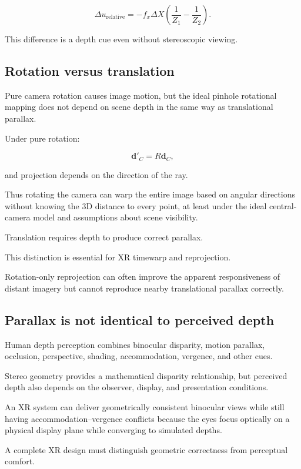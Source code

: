 \[ \boxed{ \Delta u_{\mathrm{relative}} = -f_x\Delta X \left( \frac1{Z_1}-\frac1{Z_2} \right). } \]

This difference is a depth cue even without stereoscopic viewing.

\subsection{Rotation versus translation}\label{02-foundations-ii-ch035-rotation-versus-translation}

Pure camera rotation causes image motion, but the ideal pinhole rotational mapping does not depend on scene depth in the same way as translational parallax.

Under pure rotation:

\[ \mathbf d'_C=R\mathbf d_C, \]

and projection depends on the direction of the ray.

Thus rotating the camera can warp the entire image based on angular directions without knowing the 3D distance to every point, at least under the ideal central-camera model and assumptions about scene visibility.

Translation requires depth to produce correct parallax.

This distinction is essential for XR timewarp and reprojection.

Rotation-only reprojection can often improve the apparent responsiveness of distant imagery but cannot reproduce nearby translational parallax correctly.

\subsection{Parallax is not identical to perceived depth}\label{02-foundations-ii-ch035-parallax-is-not-identical-to-perceived-depth}

Human depth perception combines binocular disparity, motion parallax, occlusion, perspective, shading, accommodation, vergence, and other cues.

Stereo geometry provides a mathematical disparity relationship, but perceived depth also depends on the observer, display, and presentation conditions.

An XR system can deliver geometrically consistent binocular views while still having accommodation--vergence conflicts because the eyes focus optically on a physical display plane while converging to simulated depths.

A complete XR design must distinguish geometric correctness from perceptual comfort.

